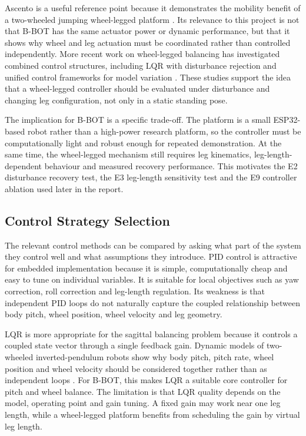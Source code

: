 \documentclass[12pt, a4paper]{article}
\begin{document}
Ascento is a useful reference point because it demonstrates the mobility benefit of a two-wheeled jumping wheel-legged platform \cite{klemm2019ascento}. Its relevance to this project is not that B-BOT has the same actuator power or dynamic performance, but that it shows why wheel and leg actuation must be coordinated rather than controlled independently. More recent work on wheel-legged balancing has investigated combined control structures, including LQR with disturbance rejection and unified control frameworks for model variation \cite{feng2023wheellegged,xin2025unified}. These studies support the idea that a wheel-legged controller should be evaluated under disturbance and changing leg configuration, not only in a static standing pose.

The implication for B-BOT is a specific trade-off. The platform is a small ESP32-based robot rather than a high-power research platform, so the controller must be computationally light and robust enough for repeated demonstration. At the same time, the wheel-legged mechanism still requires leg kinematics, leg-length-dependent behaviour and measured recovery performance. This motivates the E2 disturbance recovery test, the E3 leg-length sensitivity test and the E9 controller ablation used later in the report.

\subsection{Control Strategy Selection}

The relevant control methods can be compared by asking what part of the system they control well and what assumptions they introduce. PID control is attractive for embedded implementation because it is simple, computationally cheap and easy to tune on individual variables. It is suitable for local objectives such as yaw correction, roll correction and leg-length regulation. Its weakness is that independent PID loops do not naturally capture the coupled relationship between body pitch, wheel position, wheel velocity and leg geometry.

LQR is more appropriate for the sagittal balancing problem because it controls a coupled state vector through a single feedback gain. Dynamic models of two-wheeled inverted-pendulum robots show why body pitch, pitch rate, wheel position and wheel velocity should be considered together rather than as independent loops \cite{kim2015dynamic}. For B-BOT, this makes LQR a suitable core controller for pitch and wheel balance. The limitation is that LQR quality depends on the model, operating point and gain tuning. A fixed gain may work near one leg length, while a wheel-legged platform benefits from scheduling the gain by virtual leg length.
\end{document}
